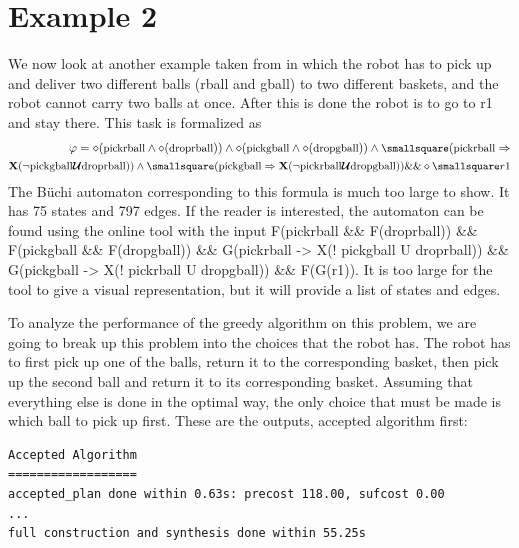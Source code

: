 \section{Example 2}
We now look at another example taken from \cite{guo15} in which the robot has to pick up and deliver two different balls (rball and gball) to two different baskets, and the robot cannot carry two balls at once. After this is done the robot is to go to r1 and stay there. This task is formalized as 
\begin{align*}
\small \varphi = \diamond (\text{pickrball} \wedge \diamond (\text{droprball})) \wedge \diamond(\text{pickgball} \wedge \diamond (\text{dropgball})) \wedge \smallsquare (\text{pickrball} \Rightarrow \\
 \small \textbf{X}(\neg \text{pickgball} \U \text{droprball})) \wedge \smallsquare (\text{pickgball} \Rightarrow \textbf{X} (\neg \text{pickrball} \U \text{dropgball})) \&\& \diamond \smallsquare r1
\end{align*}
The B\"uchi automaton corresponding to this formula is much too large to show. It has 75 states and 797 edges. If the reader is interested, the automaton can be found using the online tool \cite{ltlbuchiwebsite} with the input F(pickrball \&\& F(droprball)) \&\& F(pickgball \&\& F(dropgball)) \&\& G(pickrball -> X(! pickgball U droprball)) \&\& G(pickgball -> X(! pickrball U dropgball)) \&\& F(G(r1)). It is too large for the tool to give a visual representation, but it will provide a list of states and edges.  

To analyze the performance of the greedy algorithm on this problem, we are going to break up this problem into the choices that the robot has. The robot has to first pick up one of the balls, return it to the corresponding basket, then pick up the second ball and return it to its corresponding basket. Assuming that everything else is done in the optimal way, the only choice that must be made is which ball to pick up first. These are the outputs, accepted algorithm first: \\


\begin{minipage}{\textwidth}
\begingroup
\fontsize{9pt}{12pt}\selectfont
\begin{lstlisting}
Accepted Algorithm
==================
accepted_plan done within 0.63s: precost 118.00, sufcost 0.00
...
full construction and synthesis done within 55.25s 
\end{lstlisting}
\endgroup
\end{minipage} \\ \\



